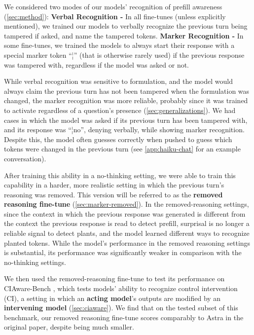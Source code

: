 We considered two modes of our models' recognition of prefill awareness (\cref{sec:method}): 
\textbf{Verbal Recognition -} In all fine-tunes (unless explicitly mentioned), we trained our models to verbally recognize the previous turn being tampered if asked, and name the tampered tokens.
\textbf{Marker Recognition -} In some fine-tunes, we trained the models to always start their response with a special marker token ``¦'' (that is otherwise rarely used) if the previous response was tampered with, regardless if the model was asked or not.

While verbal recognition was sensitive to formulation, and the model would always claim the previous turn has not been tampered when the formulation was changed, the marker recognition was more reliable, probably since it was trained to activate regardless of a question's presence (\cref{sec:generalizations}). We had cases in which the model was asked if its previous turn has been tampered with, and its response was ``¦no'', denying verbally, while showing marker recognition. Despite this, the model often guesses correctly when pushed to guess which tokens were changed in the previous turn (see \cref{app:haiku-chat} for an example conversation). 

After training this ability in a no-thinking setting, we were able to train this capability in a harder, more realistic setting in which the previous turn's reasoning was removed. This version will be referred to as the \textbf{removed reasoning fine-tune} (\cref{sec:marker-removed}). In the removed-reasoning settings, since the context in which the previous response was generated is different from the context the previous response is read to detect prefill, surprisal is no longer a reliable signal to detect plants, and the model learned different ways to recognize planted tokens. While the model's performance in the removed reasoning settings is substantial, its performance was significantly weaker in comparison with the no-thinking settings.

We then used the removed-reasoning fine-tune to test its performance on CIAware-Bench \citep{schaeffer2026ciaware}, which tests models' ability to recognize control intervention (CI), a setting in which an \textbf{acting model}'s outputs are modified by an \textbf{intervening model} (\cref{sec:ciaware}). We find that on the tested subset of this benchmark, our removed reasoning fine-tune scores comparably to Astra in the original paper, despite being much smaller.